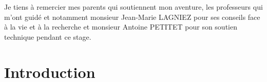 \documentclass{article}
\begin{document}
	
	\begin{comment}
	\begin{flushleft}
	\hfill Qi QIU\\
	\end{flushleft}
    	
    	
    \renewcommand{\contentsname}{\begin{LARGE}
	\end{LARGE}}
	\end{comment}
    \thispagestyle{empty}
        
    \newpage
    \thispagestyle{empty}

    \newpage
    \thispagestyle{empty}
    Je tiens à remercier mes parents qui soutiennent mon aventure, les professeurs qui m'ont guidé et notamment monsieur Jean-Marie LAGNIEZ pour ses conseils face à la vie et à la recherche et monsieur Antoine PETITET pour son soutien technique pendant ce stage. 

    \newpage
    \tableofcontents
    \thispagestyle{empty}
    
    \newpage
\setcounter{page}{1}

    

\section{Introduction}
\end{document}
